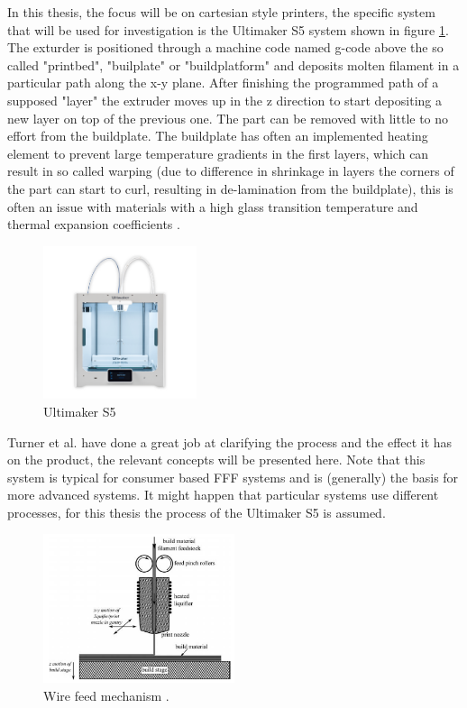 In this thesis, the focus will be on cartesian style printers, the specific system that will be used for investigation is the Ultimaker S5 system \cite{Ultimaker2019UltimakerSheet} shown in figure \ref{fig:Ultimaker}. The exturder is positioned through a machine code named g-code above the so called "printbed", "builplate" or "buildplatform" and deposits molten filament in a particular path along the x-y plane. After finishing the programmed path of a supposed "layer" the extruder moves up in the z direction to start depositing a new layer on top of the previous one. The part can be removed with little to no effort from the buildplate. The buildplate has often an implemented heating element to prevent large temperature gradients in the first layers, which can result in so called warping (due to difference in shrinkage in layers the corners of the part can start to curl, resulting in de-lamination from the buildplate), this is often an issue with materials with a high glass transition temperature and thermal expansion coefficients \cite{Turner2014AModeling}. 

\begin{figure}[H]
    \centering
    \includegraphics[width=0.40\textwidth]{chapter_2/figures/UltimakerS5.png}
    \caption{Ultimaker S5 \cite{Ultimaker2019UltimakerSheet}}
    \label{fig:Ultimaker}
\end{figure}

 Turner et al.\cite{Turner2014AModeling} have done a great job at clarifying the process and the effect it has on the product, the relevant concepts will be presented here. Note that this system is typical for consumer based FFF systems and is (generally) the basis for more advanced systems. It might happen that particular systems use different processes, for this thesis the process of the Ultimaker S5 is assumed. 

\begin{figure}[H]
    \centering
    \includegraphics[width=0.50\textwidth]{chapter_2/figures/Wirefeedmechanism.PNG}
    \caption{Wire feed mechanism \cite{Turner2014AModeling}.}
    \label{fig:Wirefeed}
\end{figure}


